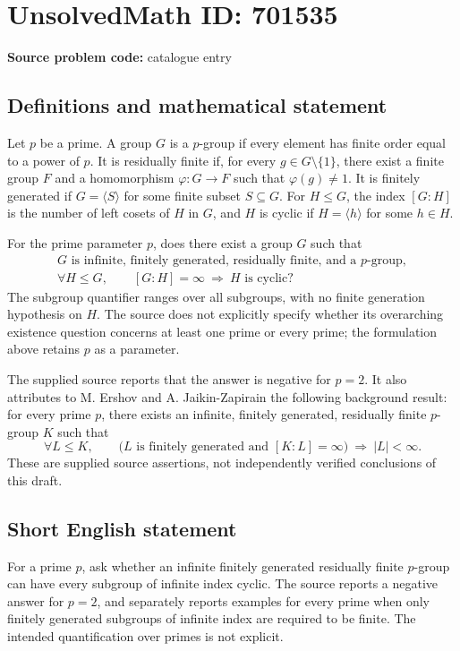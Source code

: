 \documentclass[11pt]{article}
\begin{document}
\section*{UnsolvedMath ID: 701535}
\textbf{Source problem code:} catalogue entry
\subsection{Definitions and mathematical statement}
Let \(p\) be a prime. A group \(G\) is a \(p\)-group if every element has finite order equal to a power of \(p\). It is residually finite if, for every \(g\in G\setminus\{1\}\), there exist a finite group \(F\) and a homomorphism \(\varphi:G\to F\) such that \(\varphi(g)\ne 1\). It is finitely generated if \(G=\langle S\rangle\) for some finite subset \(S\subseteq G\). For \(H\le G\), the index \([G:H]\) is the number of left cosets of \(H\) in \(G\), and \(H\) is cyclic if \(H=\langle h\rangle\) for some \(h\in H\).

For the prime parameter \(p\), does there exist a group \(G\) such that
\[
\begin{gathered}
G\text{ is infinite, finitely generated, residually finite, and a }p\text{-group},\\
\forall H\le G,\qquad [G:H]=\infty\ \Longrightarrow\ H\text{ is cyclic}?
\end{gathered}
\]
The subgroup quantifier ranges over all subgroups, with no finite generation hypothesis on \(H\). The source does not explicitly specify whether its overarching existence question concerns at least one prime or every prime; the formulation above retains \(p\) as a parameter.

The supplied source reports that the answer is negative for \(p=2\). It also attributes to M. Ershov and A. Jaikin-Zapirain the following background result: for every prime \(p\), there exists an infinite, finitely generated, residually finite \(p\)-group \(K\) such that
\[
\forall L\le K,\qquad
\bigl(L\text{ is finitely generated and }[K:L]=\infty\bigr)
\ \Longrightarrow\ |L|<\infty.
\]
These are supplied source assertions, not independently verified conclusions of this draft.
\subsection{Short English statement}
For a prime \(p\), ask whether an infinite finitely generated residually finite \(p\)-group can have every subgroup of infinite index cyclic. The source reports a negative answer for \(p=2\), and separately reports examples for every prime when only finitely generated subgroups of infinite index are required to be finite. The intended quantification over primes is not explicit.
\end{document}
